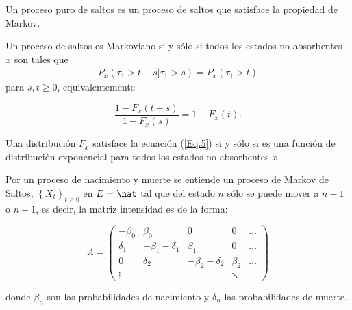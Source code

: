 Un proceso puro de saltos es un proceso de saltos que satisface la
propiedad de Markov.
\begin{Prop}
Un proceso de saltos es Markoviano si y s\'olo si todos los
estados no absorbentes $x$ son tales que
\begin{eqnarray*}
P_{x}\left(\tau_{1}>t+s|\tau_{1}>s\right)=P_{x}\left(\tau_{1}>t\right)
\end{eqnarray*}
para $s,t\geq0$, equivalentemente

\begin{equation}\label{Eq.5}
\frac{1-F_{x}\left(t+s\right)}{1-F_{x}\left(s\right)}=1-F_{x}\left(t\right).
\end{equation}

\end{Prop}

\begin{Note}
Una distribuci\'on $F_{x}$ satisface la ecuaci\'on (\ref{Eq.5}) si
y s\'olo si es una funci\'on de distribuci\'on exponencial para
todos los estados no absorbentes $x$.
\end{Note}

Por un proceso de nacimiento y muerte se entiende un proceso de
Markov de Saltos, $\left\{X_{t}\right\}_{t\geq0}$ en $E=\nat$ tal
que del estado $n$ s\'olo se puede mover a $n-1$ o $n+1$, es
decir, la matriz intensidad es de la forma:

\begin{equation}
\Lambda=\left(\begin{array}{ccccc}
-\beta_{0}&\beta_{0} & 0 & 0 & \ldots\\
\delta_{1}&-\beta_{1}-\delta_{1} & \beta_{1}&0&\ldots\\
0&\delta_{2}&-\beta_{2}-\delta_{2} & \beta_{2}&\ldots\\
\vdots & & & \ddots &
\end{array}\right)
\end{equation}

donde $\beta_{n}$ son las probabilidades de nacimiento y
$\delta_{n}$ las probabilidades de muerte.

